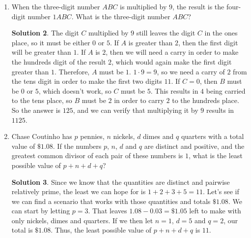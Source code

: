 \documentclass{article}
\theoremstyle{definition}
\newtheorem*{solution}{Solution}
\begin{document}
\begin{multicols}{2}
\begin{enumerate}
\begin{solution}
                We can also use the Euclidean algorithm to find the GCD first, and then use that to find the LCM:
                \[
                    365 \quad 130 \quad 105 \quad 25 \quad 5 \quad 0
                \]
                The GCD is $5$, so the LCM is $\frac{130 \cdot 365}{5} = \boxed{9490}$.
            \end{solution}
        \item When the three-digit number $ABC$ is multiplied by $9$, the result is the four-digit number $1ABC$.
            What is the three-digit number $ABC$?
            \begin{solution}
                The digit $C$ multiplied by $9$ still leaves the digit $C$ in the ones place, so it must be either $0$ or $5$.
                If $A$ is greater than $2$, then the first digit will be greater than $1$.
                If $A$ is $2$, then we will need a carry in order to make the hundreds digit of the result $2$, which would again make the first digit greater than $1$.
                Therefore, $A$ must be $1$.
                $1 \cdot 9 = 9$, so we need a carry of $2$ from the tens digit in order to make the first two digits $11$.
                If $C = 0$, then $B$ must be $0$ or $5$, which doesn't work, so $C$ must be $5$.
                This results in $4$ being carried to the tens place, so $B$ must be $2$ in order to carry $2$ to the hundreds place.
                So the answer is $\boxed{125}$, and we can verify that multiplying it by $9$ results in $1125$.
            \end{solution}
        \item Chase Coutinho has $p$ pennies, $n$ nickels, $d$ dimes and $q$ quarters with a total value of $\$1.08$.
            If the numbers $p$, $n$, $d$ and $q$ are distinct and positive, and the greatest common divisor of each pair of these numbers is $1$, what is the least possible value of $p + n + d + q$?
            \begin{solution}
                Since we know that the quantities are distinct and pairwise relatively prime, the least we can hope for is $1 + 2 + 3 + 5 = 11$.
                Let's see if we can find a scenario that works with those quantities and totals $\$1.08$.
                We can start by letting $p = 3$. That leaves $1.08 - 0.03 = \$1.05$ left to make with only nickels, dimes and quarters.
                If we then let $n = 1$, $d = 5$ and $q = 2$, our total is $\$1.08$.
                Thus, the least possible value of $p + n + d + q$ is $\boxed{11}$.
            \end{solution}
    \end{enumerate}
\end{multicols}
\end{document}
